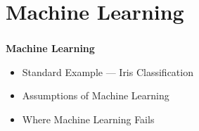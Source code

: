 \documentclass[bigger]{beamer}
\begin{document}
\section{Machine Learning}
%
\begin{frame}
    \frametitle{}
    \begin{center}
        \vfill
        {\huge\bf Machine Learning}
    \end{center}
    \vfill
    \begin{itemize}
        \item Standard Example --- Iris Classification
        \item Assumptions of Machine Learning
        \item Where Machine Learning Fails
    \end{itemize}
    \vfill
\end{frame}
%
\end{document}
